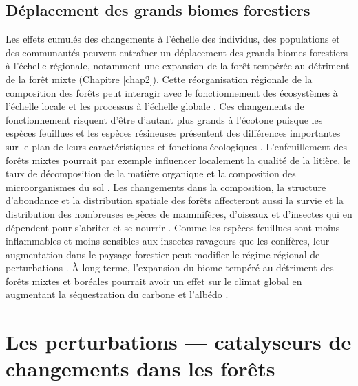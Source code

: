 \hypertarget{duxe9placement-des-grands-biomes-forestiers}{%
\subsection{Déplacement des grands biomes
forestiers}\label{duxe9placement-des-grands-biomes-forestiers}}

Les effets cumulés des changements à l'échelle des individus, des
populations et des communautés peuvent entraîner un déplacement des
grands biomes forestiers à l'échelle régionale, notamment une expansion
de la forêt tempérée au détriment de la forêt mixte (Chapitre
\ref{chap2}). Cette réorganisation régionale de la composition des
forêts peut interagir avec le fonctionnement des écosystèmes à l'échelle
locale et les processus à l'échelle globale \citep[\emph{cross-scale
interactions};][]{peters_crossscale_2007}. Ces changements de
fonctionnement risquent d'être d'autant plus grands à l'écotone puisque
les espèces feuillues et les espèces résineuses présentent des
différences importantes sur le plan de leurs caractéristiques et
fonctions écologiques \citep{wardle_terrestrial_2011}. L'enfeuillement
des forêts mixtes pourrait par exemple influencer localement la qualité
de la litière, le taux de décomposition de la matière organique et la
composition des microorganismes du sol
\citep{laganiere_how_2010, legare_influence_2005}. Les changements dans
la composition, la structure d'abondance et la distribution spatiale des
forêts affecteront aussi la survie et la distribution des nombreuses
espèces de mammifères, d'oiseaux et d'insectes qui en dépendent pour
s'abriter et se nourrir \citep{friggens_effects_2018}. Comme les espèces
feuillues sont moins inflammables et moins sensibles aux insectes
ravageurs que les conifères, leur augmentation dans le paysage forestier
peut modifier le régime régional de perturbations
\citep{terrier_potential_2013, mffp_insectes_2018}. À long terme,
l'expansion du biome tempéré au détriment des forêts mixtes et boréales
pourrait avoir un effet sur le climat global en augmentant la
séquestration du carbone \citep{thurner_carbon_2014} et l'albédo
\citep{anderson_biophysical_2011}.

\hypertarget{les-perturbations-catalyseurs-de-changements-dans-les-foruxeats}{%
\section{Les perturbations --- catalyseurs de changements dans les
forêts}\label{les-perturbations-catalyseurs-de-changements-dans-les-foruxeats}}

